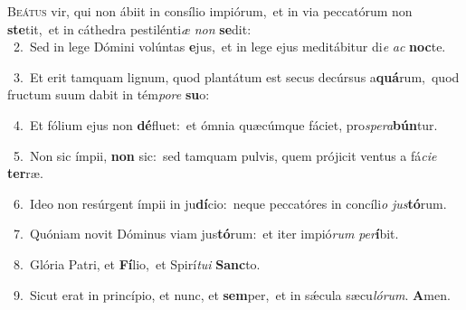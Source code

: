 \lettrine{\initial\textcolor{\initialcolor}{B}}{eátus} vir, qui non ábiit in consílio impiórum,~\dagger et in via peccatórum non \textbf{ste}\-tit,~\star et in cáthedra pestilénti\textit{æ} \textit{non} \textbf{se}\-dit:\\
{\numbfont\textcolor{\numbcolor}{~2.}}~Sed in lege Dómini volúntas \textbf{e}\-jus,~\star et in lege ejus meditábitur di\textit{e} \textit{ac} \textbf{noc}\-te.\par
{\numbfont\textcolor{\numbcolor}{~3.}}~Et erit tamquam lignum, quod plantátum est secus decúrsus a\-\textbf{quá}\-rum,~\star quod fructum suum dabit in tém\-\textit{po}\-\textit{re} \textbf{su}\-o:\par
{\numbfont\textcolor{\numbcolor}{~4.}}~Et fólium ejus non \textbf{dé}\-fluet:~\star et ómnia quæcúmque fáciet, pro\-\textit{spe}\-\textit{ra}\textbf{bún}tur.\par
{\numbfont\textcolor{\numbcolor}{~5.}}~Non sic ímpii, \textbf{non} sic:~\star sed tamquam pulvis, quem prójicit ventus a fá\-\textit{ci}\-\textit{e} \textbf{ter}\-ræ.\par
{\numbfont\textcolor{\numbcolor}{~6.}}~Ideo non resúrgent ímpii in ju\-\textbf{dí}\-cio:~\star neque peccatóres in concíli\textit{o} \textit{jus}\-\textbf{tó}rum.\par
{\numbfont\textcolor{\numbcolor}{~7.}}~Quóniam novit Dóminus viam jus\-\textbf{tó}\-rum:~\star et iter impió\textit{rum} \textit{per}\-\textbf{í}bit.\par
{\numbfont\textcolor{\numbcolor}{~8.}}~Glória Patri, et \textbf{Fí}\-lio,~\star et Spirí\-\textit{tu}\-\textit{i} \textbf{Sanc}\-to.\par
{\numbfont\textcolor{\numbcolor}{~9.}}~Sicut erat in princípio, et nunc, et \textbf{sem}\-per,~\star et in sǽcula sæcu\-\textit{ló}\-\textit{rum}. \textbf{A}\-men.\par
